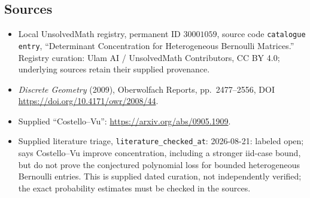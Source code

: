 \documentclass[11pt]{article}
\begin{document}
\subsection{Sources}
\begin{itemize}
\item Local UnsolvedMath registry, permanent ID \(30001059\), source code \texttt{catalogue entry}, ``Determinant Concentration for Heterogeneous Bernoulli Matrices.'' Registry curation: Ulam AI / UnsolvedMath Contributors, CC BY 4.0; underlying sources retain their supplied provenance.
\item \emph{Discrete Geometry} (2009), Oberwolfach Reports, pp.\ 2477--2556, DOI \url{https://doi.org/10.4171/owr/2008/44}.
\item Supplied ``Costello--Vu'': \url{https://arxiv.org/abs/0905.1909}.
\item Supplied literature triage, \texttt{literature\_checked\_at}: 2026-08-21: labeled open; says Costello--Vu improve concentration, including a stronger iid-case bound, but do not prove the conjectured polynomial loss for bounded heterogeneous Bernoulli entries. This is supplied dated curation, not independently verified; the exact probability estimates must be checked in the sources.
\end{itemize}
\end{document}
